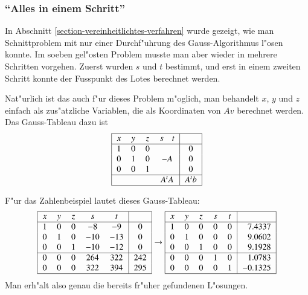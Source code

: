 \subsubsection{``Alles in einem Schritt''}
In Abschnitt \ref{section-vereinheitlichtes-verfahren} wurde gezeigt,
wie man Schnittproblem mit nur einer Durchf"uhrung des Gauss-Algorithmus
l"osen konnte.
Im soeben gel"osten Problem musste man aber wieder
in mehrere Schritten vorgehen.
Zuerst wurden $s$ und $t$ bestimmt,
und erst in einem zweiten Schritt konnte der Fusspunkt des Lotes
berechnet werden.

Nat"urlich ist das auch f"ur dieses Problem m"oglich, man behandelt
$x$, $y$ und $z$ einfach als zus"atzliche Variablen, die als Koordinaten
von $Av$ berechnet werden.
Das Gauss-Tableau dazu ist
\[
\begin{tabular}{|>{$}c<{$}>{$}c<{$}>{$}c<{$}>{$}c<{$}|>{$}c<{$}|}
\hline
x&y&z&s\quad t&\\
\hline
1&0&0&        &0\\
0&1&0&-A   &0\\
0&0&1&        &0\\
\hline
 & & &A^tA    &A^tb\\
\hline
\end{tabular}
\]
\begin{beispiel}
F"ur das Zahlenbeispiel lautet dieses Gauss-Tableau:
\[
\begin{tabular}{|>{$}c<{$}>{$}c<{$}>{$}c<{$}>{$}c<{$}>{$}c<{$}|>{$}c<{$}|}
\hline
x&y&z&s  &  t&\\
\hline
1&0&0& -8& -9&0\\
0&1&0&-10&-13&0\\
0&0&1&-10&-12&0\\
\hline
0&0&0&264&322&242\\
0&0&0&322&394&295\\
\hline
\end{tabular}
\rightarrow
\begin{tabular}{|>{$}c<{$}>{$}c<{$}>{$}c<{$}>{$}c<{$}>{$}c<{$}|>{$}r<{$}|}
\hline
x&y&z&s  &  t&\\
\hline
1&0&0&0&0&7.4337\\
0&1&0&0&0&9.0602\\
0&0&1&0&0&9.1928\\
\hline
0&0&0&1&0&1.0783\\
0&0&0&0&1&-0.1325\\
\hline
\end{tabular}
\]
Man erh"alt also genau die bereits fr"uher gefundenen L"osungen.
\end{beispiel}


